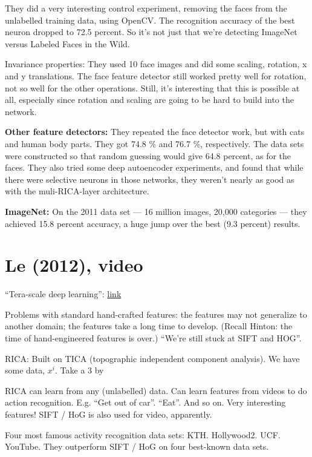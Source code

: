 \documentclass[12pt]{report}
\newcommand{\link}[2]{\href{#1}{#2}}
\begin{document}
They did a very interesting control experiment, removing the faces
from the unlabelled training data, using OpenCV.  The recognition
accuracy of the best neuron dropped to 72.5 percent.  So it's not just
that we're detecting ImageNet versus Labeled Faces in the Wild.

Invariance properties: They used 10 face images and did some scaling,
rotation, x and y translations.  The face feature detector still
worked pretty well for rotation, not so well for the other operations.
Still, it's interesting that this is possible at all, especially since
rotation and scaling are going to be hard to build into the network.

\textbf{Other feature detectors:} They repeated the face detector
work, but with cats and human body parts.  They got 74.8 \% and 76.7
\%, respectively.  The data sets were constructed so that random
guessing would give 64.8 percent, as for the faces.  They also tried
some deep autoencoder experiments, and found that while there were
selective neurons in those networks, they weren't nearly as good as
with the muli-RICA-layer architecture.

\textbf{ImageNet:} On the 2011 data set --- 16 million images, 20,000
categories --- they achieved 15.8 percent accuracy, a huge jump over
the best (9.3 percent) results.

\section{Le (2012), video}

``Tera-scale deep learning'': \link{http://vimeo.com/52332329}{link}

Problems with standard hand-crafted features: the features may not
generalize to another domain; the features take a long time to
develop.  (Recall Hinton: the time of hand-engineered features is
over.)  ``We're still stuck at SIFT and HOG''.  

RICA: Built on TICA (topographic independent component analysis).  We
have some data, $x^i$.  Take a 3 by 

RICA can learn from any (unlabelled) data.  Can learn features from
videos to do action recognition.  E.g. ``Get out of car''.  ``Eat''.
And so on.  Very interesting features!  SIFT / HoG is also used for
video, apparently.

Four most famous activity recognition data sets: KTH.
Hollywood2. UCF. YouTube.  They outperform SIFT / HoG on four
best-known data sets.
\end{document}
